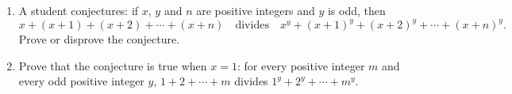 \begin{enumerate}
\item[(a)] A student conjectures: if $x$, $y$ and $n$ are positive integers and $y$ is odd, then
\[x+(x+1)+(x+2)+\cdots+(x+n)\quad\text{divides}\quad x^y+(x+1)^y+(x+2)^y+\cdots+(x+n)^y.\]
Prove or disprove the conjecture.
\item[(b)] Prove that the conjecture is true when $x=1$: for every positive integer $m$ and every odd positive integer $y$, $1+2+\cdots+m$ divides $1^y+2^y+\cdots+m^y$.
\end{enumerate}
